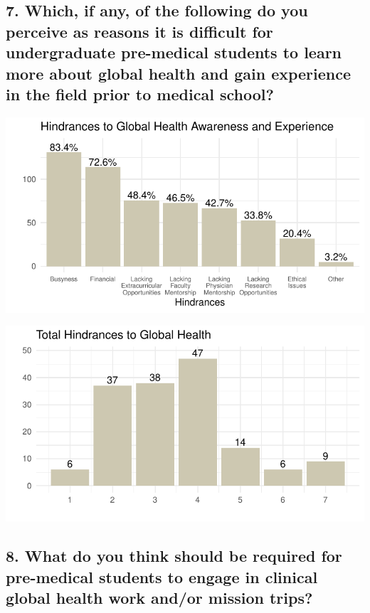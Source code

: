 \documentclass[
  letterpaper,
  DIV=11,
  numbers=noendperiod]{scrartcl}
\begin{document}
\newpage

\hypertarget{which-if-any-of-the-following-do-you-perceive-as-reasons-it-is-difficult-for-undergraduate-pre-medical-students-to-learn-more-about-global-health-and-gain-experience-in-the-field-prior-to-medical-school}{%
\subsection{7. Which, if any, of the following do you perceive as
reasons it is difficult for undergraduate pre-medical students to learn
more about global health and gain experience in the field prior to
medical
school?}\label{which-if-any-of-the-following-do-you-perceive-as-reasons-it-is-difficult-for-undergraduate-pre-medical-students-to-learn-more-about-global-health-and-gain-experience-in-the-field-prior-to-medical-school}}

\includegraphics{GlobalHealthQuarto6-10_files/figure-pdf/unnamed-chunk-7-1.pdf}

\includegraphics{GlobalHealthQuarto6-10_files/figure-pdf/unnamed-chunk-8-1.pdf}

\newpage

\hypertarget{what-do-you-think-should-be-required-for-pre-medical-students-to-engage-in-clinical-global-health-work-andor-mission-trips}{%
\subsection{8. What do you think should be required for pre-medical
students to engage in clinical global health work and/or mission
trips?}\label{what-do-you-think-should-be-required-for-pre-medical-students-to-engage-in-clinical-global-health-work-andor-mission-trips}}
\end{document}
